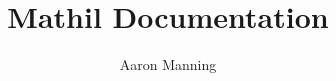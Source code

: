 \documentclass[titlepage, 12pt, a4paper]{article}
\title{Mathil Documentation}
\author{Aaron Manning}
\date{}
\begin{document}
    \maketitle
    \tableofcontents

    \allowdisplaybreaks

    \raggedright


    
\end{document}
